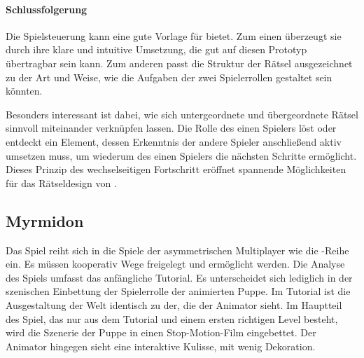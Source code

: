 \paragraph{Schlussfolgerung}
Die Spielsteuerung kann eine gute Vorlage für  bietet. Zum einen überzeugt sie durch ihre klare und intuitive Umsetzung, die gut auf diesen Prototyp übertragbar sein kann. Zum anderen passt die Struktur der Rätsel ausgezeichnet zu der Art und Weise, wie die Aufgaben der zwei Spielerrollen gestaltet sein könnten.

Besonders interessant ist dabei, wie sich untergeordnete und übergeordnete Rätsel sinnvoll miteinander verknüpfen lassen. Die Rolle des einen Spielers löst oder entdeckt ein Element, dessen Erkenntnis der andere Spieler anschließend aktiv umsetzen muss, um wiederum des einen Spielers die nächsten Schritte ermöglicht. Dieses Prinzip des wechselseitigen Fortschritt eröffnet spannende Möglichkeiten für das Rätseldesign von .

\subsection{Myrmidon}
Das Spiel  reiht sich in die Spiele der asymmetrischen Multiplayer wie die -Reihe ein. Es müssen kooperativ Wege freigelegt und ermöglicht werden. Die Analyse des Spiels umfasst das anfängliche Tutorial. Es unterscheidet sich lediglich in der szenischen Einbettung der Spielerrolle der animierten Puppe. Im Tutorial ist die Ausgestaltung der Welt identisch zu der, die der Animator sieht. Im Hauptteil des Spiel, das nur aus dem Tutorial und einem ersten richtigen Level besteht, wird die Szenerie der Puppe in einen Stop-Motion-Film eingebettet. Der Animator hingegen sieht eine interaktive Kulisse, mit wenig Dekoration.

